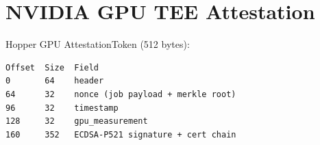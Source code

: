 \section{NVIDIA GPU TEE Attestation}


Hopper GPU AttestationToken (512 bytes):

\begin{lstlisting}
Offset  Size  Field
0       64    header
64      32    nonce (job payload + merkle root)
96      32    timestamp
128     32    gpu_measurement
160     352   ECDSA-P521 signature + cert chain
\end{lstlisting}

